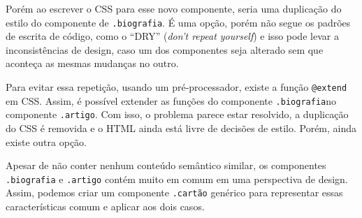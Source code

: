 \begin{Shaded}
\begin{Highlighting}[]
\KeywordTok{>} 
    \KeywordTok{>} 
\StringTok{        }\ErrorTok{<}\KeywordTok{>} 
        \KeywordTok{>} 
\end{Highlighting}
\end{Shaded}

Porém ao escrever o CSS para esse novo componente, seria uma duplicação
do estilo do componente de \texttt{.biografia}. É uma opção, porém não
segue os padrões de escrita de código, como o ``DRY'' (\emph{don't
repeat yourself}) e isso pode levar a inconsistências de design, caso um
dos componentes seja alterado sem que aconteça as mesmas mudanças no
outro.

Para evitar essa repetição, usando um pré-processador, existe a função
\texttt{@extend} em CSS. Assim, é possível extender as funções do
componente \texttt{.biografia}no componente \texttt{.artigo}. Com isso,
o problema parece estar resolvido, a duplicação do CSS é removida e o
HTML ainda está livre de decisões de estilo. Porém, ainda existe outra
opção.

Apesar de não conter nenhum conteúdo semântico similar, os componentes
\texttt{.biografia} e \texttt{.artigo} contém muito em comum em uma
perspectiva de design. Assim, podemos criar um componente
\texttt{.cartão} genérico para representar essas características comum e
aplicar aos dois casos.

\begin{Shaded}
\begin{Highlighting}[]
\KeywordTok{>} 
    \KeywordTok{>} 
\StringTok{        }\ErrorTok{<}\KeywordTok{>} 
        \KeywordTok{>} 
\end{Highlighting}
\end{Shaded}

